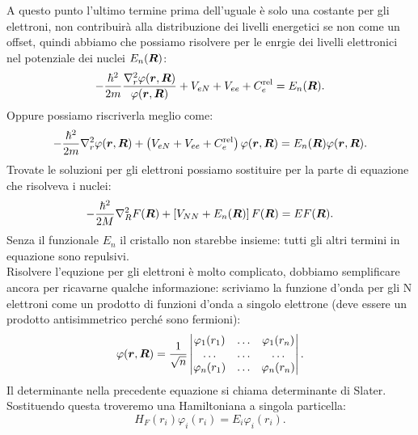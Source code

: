 A questo punto l'ultimo termine prima dell'uguale è solo una costante per gli elettroni, non contribuirà alla distribuzione dei livelli energetici se non come un offset, quindi abbiamo che possiamo risolvere per le enrgie dei livelli elettronici nel potenziale dei nuclei $E_n(\boldsymbol{R})$:
\[
	-\frac{\hbar ^2}{2m}
	\frac{\nabla_r^2 \varphi(\boldsymbol{r},\boldsymbol{R})}{\varphi(\boldsymbol{r},\boldsymbol{R})} +
	V_{eN} + V_{ee} + C_e^{\text{rel}} = E_n(\boldsymbol{R})
.\] 
Oppure possiamo riscriverla meglio come:
\[
	-\frac{\hbar ^2}{2m}
	\nabla_r^2 \varphi(\boldsymbol{r},\boldsymbol{R}) +
	\left( V_{eN} + V_{ee} + C_e^{\text{rel}} \right)
	\varphi(\boldsymbol{r},\boldsymbol{R}) = E_n(\boldsymbol{R})\varphi(\boldsymbol{r}, \boldsymbol{R})
.\] 
Trovate le soluzioni per gli elettroni possiamo sostituire per la parte di equazione che risolveva i nuclei:
\[
	-\frac{\hbar ^2}{2M}\nabla_R^2F(\boldsymbol{R})+
	\left[ V_{NN}+E_n(\boldsymbol{R}) \right] F(\boldsymbol{R})=
	E F(\boldsymbol{R})
.\] 
Senza il funzionale $E_n$ il cristallo non starebbe insieme: tutti gli altri termini in equazione sono repulsivi.\\
Risolvere l'equzione per gli elettroni è molto complicato, dobbiamo semplificare ancora per ricavarne qualche informazione: scriviamo la funzione d'onda per gli N elettroni come un prodotto di funzioni d'onda a singolo elettrone (deve essere un prodotto antisimmetrico perché sono fermioni):
\[
	\varphi(\boldsymbol{r},\boldsymbol{R}) =
	\frac{1}{\sqrt{n}}
	\begin{vmatrix}
		\varphi_1(r_1) 	& \ldots 	& \varphi_1(r_n)\\
		\ldots		& \ldots	&\ldots	\\
		\varphi_n(r_1)	&\ldots		& \varphi_n(r_n)
	\end{vmatrix}
.\] 
Il determinante nella precedente equazione si chiama determinante di Slater. Sostituendo questa troveremo una Hamiltoniana a singola particella:
\[
	H_{F}(r_i)\varphi_i(r_i) = 
	E_i \varphi_i(r_i)
.\] 
